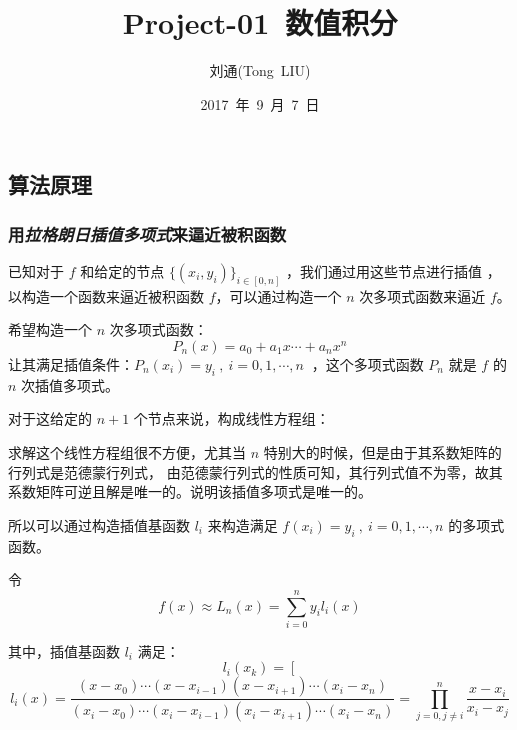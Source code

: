 \documentclass[UTF8,a4paper]{ctexart}
\begin{document}
\begin{spacing}{1.5}%

\title{  Project-01~数值积分 } %
\author{刘通(Tong~LIU)} %
\date{2017~年~9~月~7~日} %
\maketitle %
\tableofcontents %
\newpage
\part{算法原理}
\section{用\emph{拉格朗日插值多项式}来逼近被积函数}
已知对于 $ f $ 和给定的节点 $ \{ (x_i,y_i) \}_{i \in [0,n] } $ ，我们通过用这些节点进行插值
，以构造一个函数来逼近被积函数 $ f $，可以通过构造一个 $ n $ 次多项式函数来逼近 $ f $。

希望构造一个 $ n $ 次多项式函数：
$$ P_{n}(x) = a_0 + a_1 x \cdots + a_n x^n  $$
让其满足插值条件：$ P_{n}(x_i) = y_i~,~i=0,1,\cdots,n~$ ，这个多项式函数 $ P_{n} $ 就是
$ f $ 的 $ n $ 次插值多项式。

对于这给定的 $ n+1 $ 个节点来说，构成线性方程组：

求解这个线性方程组很不方便，尤其当 $n$ 特别大的时候，但是由于其系数矩阵的行列式是范德蒙行列式，
由范德蒙行列式的性质可知，其行列式值不为零，故其系数矩阵可逆且解是唯一的。说明该插值多项式是唯一的。

所以可以通过构造插值基函数 $ l_i $ 来构造满足 $ f(x_i) = y_i~,~i=0,1,\cdots,n $ 的多项式函数。

令
\begin{equation}
\boxed{ f(x) \approx L_{n}(x) = \sum \limits _{i=0}^{n} y_i l_i(x) }
\label{eq:1}
\end{equation}

其中，插值基函数 $l_i$ 满足：
\begin{equation*}
l_i(x_k) = \left[ \right.
\end{equation*}
\begin{equation}
l_{i}(x) = \dfrac{ (x-x_0)\cdots(x-x_{i-1})(x-x_{i+1})\cdots(x_i-x_n) }{ (x_i-x_0)\cdots(x_i-x_{i-1})(x_i-x_{i+1})\cdots(x_i-x_n) } = \prod _{j=0,j \neq i}^{n} \dfrac{x-x_i}{x_i-x_j}
\end{equation}


\end{spacing}
\end{document}
